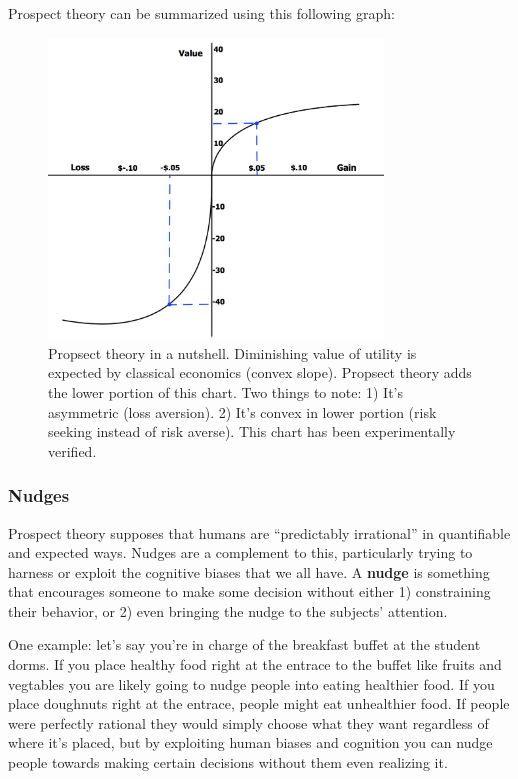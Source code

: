 \documentclass[11pt]{article}
\begin{document}
\FloatBarrier
Prospect theory can be summarized using this following graph:

\begin{figure}[h]
    \centering
    \includegraphics*[width=3.5in]{prospect_theory.png}
    \caption{Propsect theory in a nutshell. Diminishing value of utility is expected by classical economics (convex slope). Propsect theory adds the lower portion of this chart. Two things to note: 1) It's asymmetric (loss aversion). 2) It's convex in lower portion (risk seeking instead of risk averse). This chart has been experimentally verified.}
    \label{fig:ptheory}
\end{figure}
\FloatBarrier

\subsubsection{Nudges}
Prospect theory supposes that humans are ``predictably irrational'' in quantifiable and expected ways.
Nudges are a complement to this, particularly trying to harness or exploit the cognitive biases that we all have.  
A {\bf nudge} is something that encourages someone to make some decision without either 1) constraining their behavior, or 2) even bringing the nudge to the subjects' attention.

One example: let's say you're in charge of the breakfast buffet at the student dorms. If you place healthy food right at the entrace to the buffet like fruits and vegtables you are likely going to nudge people into eating healthier food. If you place doughnuts right at the entrace, people might eat unhealthier food. If people were perfectly rational they would simply choose what they want regardless of where it's placed, but by exploiting human biases and cognition you can nudge people towards making certain decisions without them even realizing it. 
\end{document}
